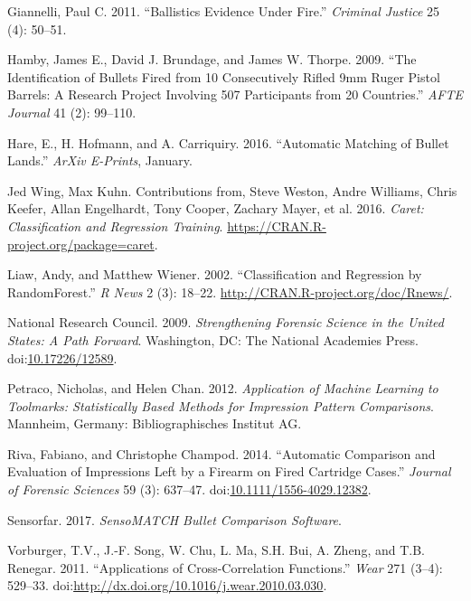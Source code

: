 \documentclass[12pt,]{article}
\theoremstyle{definition}
\theoremstyle{definition}
\theoremstyle{definition}
\theoremstyle{remark}
\begin{document}
\hypertarget{ref-giannelli:2011}{}
Giannelli, Paul C. 2011. ``Ballistics Evidence Under Fire.''
\emph{Criminal Justice} 25 (4): 50--51.

\hypertarget{ref-hamby:2009}{}
Hamby, James E., David J. Brundage, and James W. Thorpe. 2009. ``The
Identification of Bullets Fired from 10 Consecutively Rifled 9mm Ruger
Pistol Barrels: A Research Project Involving 507 Participants from 20
Countries.'' \emph{AFTE Journal} 41 (2): 99--110.

\hypertarget{ref-2016arXiv160105788H}{}
Hare, E., H. Hofmann, and A. Carriquiry. 2016. ``Automatic Matching of
Bullet Lands.'' \emph{ArXiv E-Prints}, January.

\hypertarget{ref-caretpkg}{}
Jed Wing, Max Kuhn. Contributions from, Steve Weston, Andre Williams,
Chris Keefer, Allan Engelhardt, Tony Cooper, Zachary Mayer, et al. 2016.
\emph{Caret: Classification and Regression Training}.
\url{https://CRAN.R-project.org/package=caret}.

\hypertarget{ref-randomForest}{}
Liaw, Andy, and Matthew Wiener. 2002. ``Classification and Regression by
RandomForest.'' \emph{R News} 2 (3): 18--22.
\url{http://CRAN.R-project.org/doc/Rnews/}.

\hypertarget{ref-NAS:2009}{}
National Research Council. 2009. \emph{Strengthening Forensic Science in
the United States: A Path Forward}. Washington, DC: The National
Academies Press.
doi:\href{https://doi.org/10.17226/12589}{10.17226/12589}.

\hypertarget{ref-petraco:2012}{}
Petraco, Nicholas, and Helen Chan. 2012. \emph{Application of Machine
Learning to Toolmarks: Statistically Based Methods for Impression
Pattern Comparisons}. Mannheim, Germany: Bibliographisches Institut AG.

\hypertarget{ref-riva:2014}{}
Riva, Fabiano, and Christophe Champod. 2014. ``Automatic Comparison and
Evaluation of Impressions Left by a Firearm on Fired Cartridge Cases.''
\emph{Journal of Forensic Sciences} 59 (3): 637--47.
doi:\href{https://doi.org/10.1111/1556-4029.12382}{10.1111/1556-4029.12382}.

\hypertarget{ref-sensorfar}{}
Sensorfar. 2017. \emph{SensoMATCH Bullet Comparison Software}.

\hypertarget{ref-vorburger:2011}{}
Vorburger, T.V., J.-F. Song, W. Chu, L. Ma, S.H. Bui, A. Zheng, and T.B.
Renegar. 2011. ``Applications of Cross-Correlation Functions.''
\emph{Wear} 271 (3--4): 529--33.
doi:\href{https://doi.org/http://dx.doi.org/10.1016/j.wear.2010.03.030}{http://dx.doi.org/10.1016/j.wear.2010.03.030}.
\end{document}
